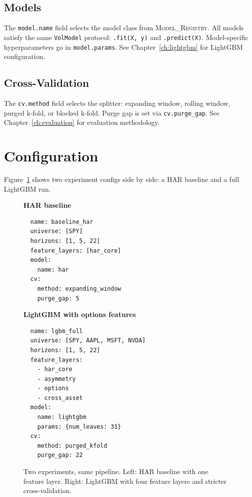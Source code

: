 \subsection{Models}

The \texttt{model.name} field selects the model class from \textsc{Model\_Registry}.
All models satisfy the same \texttt{VolModel} protocol: \texttt{.fit(X, y)} and \texttt{.predict(X)}.
Model-specific hyperparameters go in \texttt{model.params}.
See Chapter~\ref{ch:lightgbm} for LightGBM configuration.

\subsection{Cross-Validation}

The \texttt{cv.method} field selects the splitter: expanding window, rolling window, purged k-fold, or blocked k-fold.
Purge gap is set via \texttt{cv.purge\_gap}.
See Chapter~\ref{ch:evaluation} for evaluation methodology.


\section{Configuration}
\label{sec:configuration}

Figure~\ref{fig:config-comparison} shows two experiment configs side by side: a HAR baseline and a full LightGBM run.

\begin{figure}[htbp]
\centering
\begin{minipage}[t]{0.47\textwidth}
\centering
{\small\bfseries HAR baseline}
\begin{verbatim}
  name: baseline_har
  universe: [SPY]
  horizons: [1, 5, 22]
  feature_layers: [har_core]
  model:
    name: har
  cv:
    method: expanding_window
    purge_gap: 5
\end{verbatim}
\end{minipage}%
\hfill
\begin{minipage}[t]{0.47\textwidth}
\centering
{\small\bfseries LightGBM with options features}
\begin{verbatim}
  name: lgbm_full
  universe: [SPY, AAPL, MSFT, NVDA]
  horizons: [1, 5, 22]
  feature_layers:
    - har_core
    - asymmetry
    - options
    - cross_asset
  model:
    name: lightgbm
    params: {num_leaves: 31}
  cv:
    method: purged_kfold
    purge_gap: 22
\end{verbatim}
\end{minipage}
\caption{Two experiments, same pipeline.
Left: HAR baseline with one feature layer.
Right: LightGBM with four feature layers and stricter cross-validation.}
\label{fig:config-comparison}
\end{figure}


